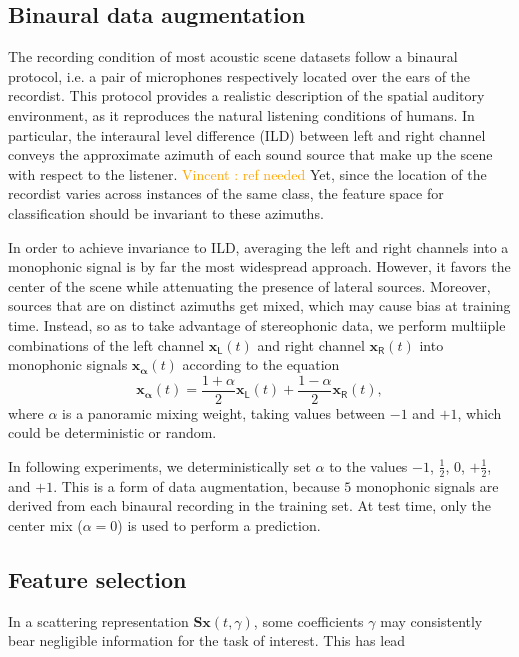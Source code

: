 \documentclass[journal]{IEEEtran}
\makeatletter
\newcommand*{\ie}{i.e.\@\xspace}
\newcommand{\vl}[1]{\textcolor{orange}{Vincent : #1}}
\makeatother
\begin{document}
\subsection{Binaural data augmentation}
The recording condition of most acoustic scene datasets follow a binaural protocol, \ie a pair of microphones respectively located over the ears of the recordist.
This protocol provides a realistic description of the spatial auditory environment, as it reproduces the natural listening conditions of humans.
In particular, the interaural level difference (ILD) between left and right channel conveys the approximate azimuth of each sound source that make up the scene with respect to the listener. \vl{ref needed}
Yet, since the location of the recordist varies across instances of the same class, the feature space for classification should be invariant to these azimuths.

In order to achieve invariance to ILD, averaging the left and right channels into a monophonic signal is by far the most widespread approach.
However, it favors the center of the scene while attenuating the presence of lateral sources.
Moreover, sources that are on distinct azimuths get mixed, which may cause bias at training time.
Instead, so as to take advantage of stereophonic data, we perform multiiple combinations of the left channel $\boldsymbol{x_{\mathsf{L}}}(t)$ and right channel $\boldsymbol{x_{\mathsf{R}}}(t)$ into monophonic signals $\boldsymbol{x_{\alpha}}(t)$ according to the equation
\begin{equation}
\boldsymbol{x_{\alpha}}(t) =
\dfrac{1+\alpha}{2} \boldsymbol{x_\mathsf{L}}(t) +
\dfrac{1-\alpha}{2} \boldsymbol{x_\mathsf{R}}(t),
\end{equation}
where $\alpha$ is a panoramic mixing weight, taking values between $-1$ and $+1$, which could be deterministic or random.

In following experiments, we deterministically set $\alpha$ to the values $-1$, $\frac{1}{2}$, $0$, $+\frac{1}{2}$, and $+1$.
This is a form of data augmentation, because $5$ monophonic signals are derived from each binaural recording in the training set.
At test time, only the center mix ($\alpha = 0$) is used to perform a prediction.

\subsection{Feature selection}
In a scattering representation $\mathbf{S}\boldsymbol{x}(t,\gamma)$, some coefficients $\gamma$ may consistently bear negligible information for the task of interest.
This has lead \cite{roma2013}
\end{document}
